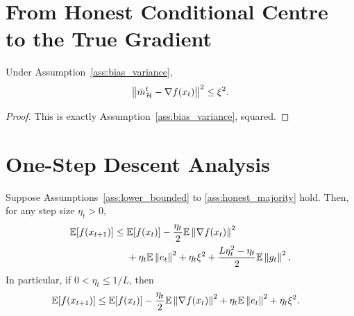 \section{From Honest Conditional Centre to the True Gradient}

\begin{lemma}
\label{lem:honest_gradient}
Under Assumption~\ref{ass:bias_variance},
\begin{equation}
    \left\lVert \bar m_{\mathcal{H}}^t - \nabla f(x_t) \right\rVert^2
    \le
    \xi^2.
    \label{eq:honest_gradient_gap}
\end{equation}
\end{lemma}

\begin{proof}
This is exactly Assumption~\ref{ass:bias_variance}, squared.
\end{proof}

\section{One-Step Descent Analysis}

\begin{lemma}
\label{lem:descent}
Suppose Assumptions~\ref{ass:lower_bounded} to \ref{ass:honest_majority}
hold.
Then, for any step size \(\eta_t > 0\),
\begin{align}
    \mathbb{E}[f(x_{t+1})]
    \le\;&
    \mathbb{E}[f(x_t)]
    -
    \frac{\eta_t}{2}\mathbb{E}\left\lVert \nabla f(x_t) \right\rVert^2
    \nonumber\\
    &+
    \eta_t \mathbb{E}\left\lVert e_t \right\rVert^2
    +
    \eta_t\xi^2
    +
    \frac{L\eta_t^2-\eta_t}{2}\mathbb{E}\left\lVert g_t \right\rVert^2.
    \label{eq:descent}
\end{align}
In particular, if \(0<\eta_t\le 1/L\), then
\begin{align}
    \mathbb{E}[f(x_{t+1})]
    \le\;&
    \mathbb{E}[f(x_t)]
    -
    \frac{\eta_t}{2}\mathbb{E}\left\lVert \nabla f(x_t) \right\rVert^2
    +
    \eta_t \mathbb{E}\left\lVert e_t \right\rVert^2
    +
    \eta_t\xi^2.
    \label{eq:descent_stepsize}
\end{align}
\end{lemma}


